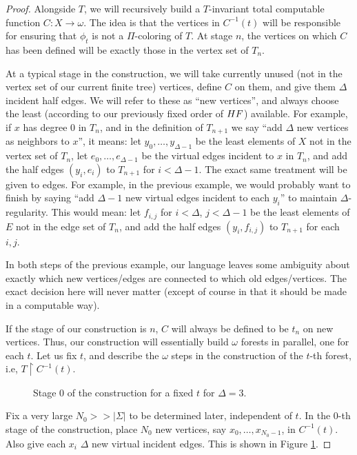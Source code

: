\documentclass[10pt,a4paper]{amsart}
\newcommand{\HF}{\textnormal{HF}}
\newcommand{\inv}{^{-1}}
\newcommand{\res}{\upharpoonright}
\begin{document}
\begin{proof}
Alongside $T$, we will recursively build a $T$-invariant total computable function $C:X \rightarrow \omega$. The idea is that the vertices in $C\inv(t)$ will be responsible for ensuring that $\phi_t$ is not a $\Pi$-coloring of $T$. At stage $n$, the vertices on which $C$ has been defined will be exactly those in the vertex set of $T_n$. 

At a typical stage in the construction, we will take currently unused (not in the vertex set of our current finite tree) vertices, define $C$ on them, and give them $\Delta$ incident half edges. We will refer to these as ``new vertices'', and always choose the least (according to our previously fixed order of $\HF$) available. For example, if $x$ has degree 0 in $T_n$, and in the definition of $T_{n+1}$ we say ``add $\Delta$ new vertices as neighbors to $x$'', it means: let $y_0,\ldots,y_{\Delta-1}$ be the least elements of $X$ not in the vertex set of $T_n$, let $e_0,\ldots,e_{\Delta-1}$ be the virtual edges incident to $x$ in $T_n$, and add the half edges $(y_i,e_i)$ to $T_{n+1}$ for $i < \Delta-1$. The exact same treatment will be given to edges. For example, in the previous example, we would probably want to finish by saying ``add $\Delta-1$ new virtual edges incident to each $y_i$'' to maintain $\Delta$-regularity. This would mean: let $f_{i,j}$ for $i < \Delta$, $j < \Delta - 1$ be the least elements of $E$ not in the edge set of $T_n$, and add the half edges $(y_i,f_{i,j})$ to $T_{n+1}$ for each $i,j$. 

In both steps of the previous example, our language leaves some ambiguity about exactly which new vertices/edges are connected to which old edges/vertices. The exact decision here will never matter (except of course in that it should be made in a computable way).

If the stage of our construction is $n$, $C$ will always be defined to be $t_n$ on new vertices. Thus, our construction will essentially build $\omega$ forests in parallel, one for each $t$. Let us fix $t$, and describe the $\omega$ steps in the construction of the $t$-th forest, i.e, $T \res C\inv(t)$.

\begin{figure}
    \centering
    
    \caption{Stage 0 of the construction for a fixed $t$ for $\Delta = 3$.}
    \label{fig:0}
\end{figure}

Fix a very large $N_0 >> |\Sigma|$ to be determined later, independent of $t$. In the 0-th stage of the construction, place $N_0$ new vertices, say $x_0,\ldots,x_{N_0-1}$, in $C\inv(t)$. Also give each $x_i$ $\Delta$ new virtual incident edges. This is shown in Figure \ref{fig:0}.


\end{proof}
\end{document}
